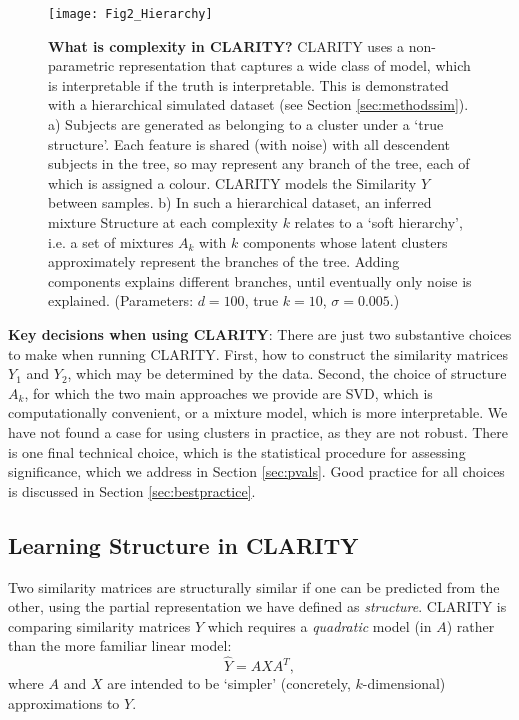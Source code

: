 \documentclass[a4]{article}
\newcommand{\+}[1]{\mathbf{#1}}
\begin{document}
\begin{figure}[!ht]
\begin{center}
 \centerline{\texttt{[image: Fig2\_Hierarchy]}}
 \caption{
 {\bf What is complexity in CLARITY?}
 CLARITY uses a non-parametric representation that captures a wide class of model, which is interpretable if the truth is interpretable. This is demonstrated with a hierarchical simulated dataset (see Section \ref{sec:methodssim}).
   a) Subjects are generated as belonging to a cluster under a `true structure'. Each feature is shared (with noise) with all descendent subjects in the tree, so may represent any branch of the tree, each of which is assigned a colour.
   CLARITY models the Similarity $Y$ between samples. 
   b) In such a hierarchical dataset, an inferred mixture Structure at each complexity $k$ relates to a `soft hierarchy', i.e. a set of mixtures $A_k$ with $k$ components whose latent clusters approximately represent the branches of the tree. Adding components explains different branches, until eventually only noise is explained. (Parameters: $d=100$, true $k=10$, $\sigma=0.005$.)}
\label{fig:sim2}
\end{center}
\end{figure}

{\bf Key decisions when using CLARITY}: There are just two substantive choices to make when running CLARITY. First, how to construct the similarity matrices $Y_1$ and $Y_2$, which may be determined by the data. Second, the choice of structure $A_k$, for which the two main approaches we provide are SVD, which is computationally convenient, or a mixture model, which is more interpretable. We have not found a case for using clusters in practice, as they are not robust. There is one final technical choice, which is the statistical procedure for assessing significance, which we address in Section \ref{sec:pvals}. Good practice for all choices is discussed in Section \ref{sec:bestpractice}. 


\subsection{Learning Structure in CLARITY}
Two similarity matrices are structurally similar if one can be predicted from the other, using the partial representation we have defined as \emph{structure}.  CLARITY is comparing similarity matrices $Y$ which requires a \emph{quadratic} model (in $A$) rather than the more familiar linear model:
$$\hat{Y} = A X A^T,$$
where $A$ and $X$ are intended to be `simpler' (concretely, $k$-dimensional) approximations to $Y$.
\end{document}
